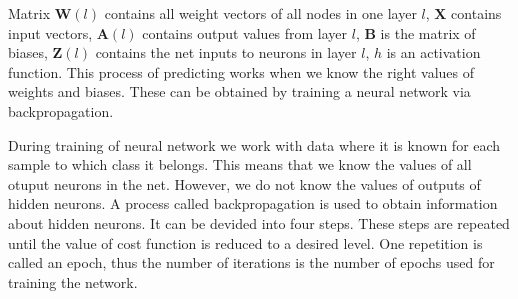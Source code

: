 Matrix $\bm{W}(l)$ contains all weight vectors of all nodes in one layer $l$, $\bm{X}$ contains input vectors, $\bm{A}(l)$ contains output values from layer $l$, $\bm{B}$ is the matrix of biases, $\bm{Z}(l)$ contains the net inputs to neurons in layer $l$, $h$ is an activation function. This process of predicting works when we know the right values of weights and biases. These can be obtained by training a neural network via backpropagation.\cite{DIP}

During training of neural network we work with data where it is known for each sample to which class it belongs. This means that we know the values of all otuput neurons in the net. However, we do not know the values of outputs of hidden neurons. A process called backpropagation is used to obtain information about hidden neurons. It can be devided into four steps. These steps are repeated until the value of cost function is reduced to a desired level. One repetition is called an epoch, thus the number of iterations is the number of epochs used for training the network. \cite{DIP}

